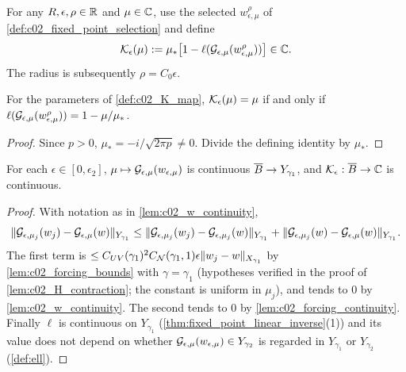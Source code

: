 \begin{definition}
  \label{def:c02_K_map}
  For any $R,\epsilon,\rho\in\mathbb{R}$ and $\mu\in\mathbb{C}$, use the selected $w_{\epsilon,\mu}^{\rho}$
  of \cref{def:c02_fixed_point_selection} and define
  \begin{equation}\label{eqn:fixed_point_obstruction_map}
    \mathcal{K}_\epsilon(\mu):=\mu_*\bigl[1-\ell(\mathcal{G}_{\epsilon,\mu}(w_{\epsilon,\mu}^{\rho}))\bigr]\in\mathbb{C} .
  \end{equation}
  The radius is subsequently $\rho=C_0\epsilon$.
\end{definition}

\begin{lemma}
  \label{lem:c02_K_map_fixed_iff}
  For the parameters of \cref{def:c02_K_map},
  $\mathcal{K}_\epsilon(\mu)=\mu$ if and only if
  $\ell(\mathcal{G}_{\epsilon,\mu}(w_{\epsilon,\mu}^{\rho}))=1-\mu/\mu_*$.
\end{lemma}
\begin{proof}
  Since $p>0$, $\mu_*=-i/\sqrt{2\pi p}\ne0$. Divide the defining identity by $\mu_*$.
\end{proof}

\begin{lemma}
  \label{lem:c02_K_continuity}
  For each $\epsilon\in[0,\epsilon_2]$, $\mu\mapsto\mathcal{G}_{\epsilon,\mu}(w_{\epsilon,\mu})$ is continuous $\overline{B}\to Y_{\gamma_1}$, and $\mathcal{K}_\epsilon:\overline{B}\to\mathbb{C}$ is continuous.
\end{lemma}
\begin{proof}
  With notation as in \cref{lem:c02_w_continuity},
  \[
    \|\mathcal{G}_{\epsilon,\mu_j}(w_j)-\mathcal{G}_{\epsilon,\mu}(w)\|_{Y_{\gamma_1}}\le\|\mathcal{G}_{\epsilon,\mu_j}(w_j)-\mathcal{G}_{\epsilon,\mu_j}(w)\|_{Y_{\gamma_1}}+\|\mathcal{G}_{\epsilon,\mu_j}(w)-\mathcal{G}_{\epsilon,\mu}(w)\|_{Y_{\gamma_1}}.
  \]
  The first term is $\le C_{UV}(\gamma_1)^2C_{\mathcal{N}}(\gamma_1,1)\epsilon\|w_j-w\|_{X_{\gamma_1}}$ by \cref{lem:c02_forcing_bounds} with $\gamma=\gamma_1$ (hypotheses
  verified in the proof of \cref{lem:c02_H_contraction}; the constant is uniform in $\mu_j$), and tends to $0$ by
  \cref{lem:c02_w_continuity}. The second tends to $0$ by \cref{lem:c02_forcing_continuity}. Finally $\ell$ is continuous on
  $Y_{\gamma_1}$ (\cref{thm:fixed_point_linear_inverse}(1)) and its value does not depend on whether $\mathcal{G}_{\epsilon,\mu}(w_{\epsilon,\mu})\in Y_{\gamma_2}$ is regarded
  in $Y_{\gamma_1}$ or $Y_{\gamma_2}$ (\cref{def:ell}).
\end{proof}

